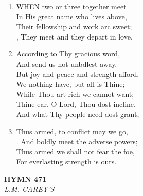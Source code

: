 \documentclass[11pt,a4paper]{article}
\begin{document}
\begin{enumerate}
    \item WHEN two or three together meet \\
        In His great name who lives above, \\
        Their fellowship and work arc sweet; \\
        , They meet and they depart in love.

    \item According to Thy gracious word, \\
        And send us not unbdlest away, \\
        But joy and peace and strength afford. \\
        We nothing have, but all is Thine; \\
        While Thou art rich we cannot want; \\
        Thine ear, O Lord, Thou dost incline, \\
        And what Thy people need dost grant,

    \item Thus armed, to conflict may we go, \\
        . And boldly meet the adverse powers; \\
        Thus armed we shall not fear the foe, \\
        For everlasting strength is ours.

\end{enumerate}

\newpage
\begin{center}
    {\Large \textbf{HYMN 471}}
    \\
    \textit{L.M. CAREY'S}
\end{center}
\vspace{1em}
\end{document}
